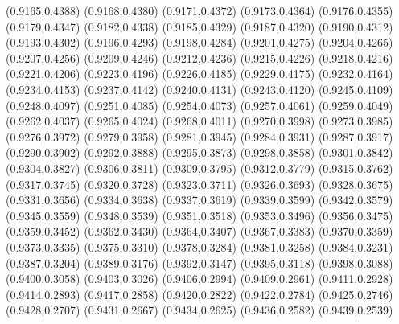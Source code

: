 \PST@Cross(0.9165,0.4388)
\PST@Cross(0.9168,0.4380)
\PST@Cross(0.9171,0.4372)
\PST@Cross(0.9173,0.4364)
\PST@Cross(0.9176,0.4355)
\PST@Cross(0.9179,0.4347)
\PST@Cross(0.9182,0.4338)
\PST@Cross(0.9185,0.4329)
\PST@Cross(0.9187,0.4320)
\PST@Cross(0.9190,0.4312)
\PST@Cross(0.9193,0.4302)
\PST@Cross(0.9196,0.4293)
\PST@Cross(0.9198,0.4284)
\PST@Cross(0.9201,0.4275)
\PST@Cross(0.9204,0.4265)
\PST@Cross(0.9207,0.4256)
\PST@Cross(0.9209,0.4246)
\PST@Cross(0.9212,0.4236)
\PST@Cross(0.9215,0.4226)
\PST@Cross(0.9218,0.4216)
\PST@Cross(0.9221,0.4206)
\PST@Cross(0.9223,0.4196)
\PST@Cross(0.9226,0.4185)
\PST@Cross(0.9229,0.4175)
\PST@Cross(0.9232,0.4164)
\PST@Cross(0.9234,0.4153)
\PST@Cross(0.9237,0.4142)
\PST@Cross(0.9240,0.4131)
\PST@Cross(0.9243,0.4120)
\PST@Cross(0.9245,0.4109)
\PST@Cross(0.9248,0.4097)
\PST@Cross(0.9251,0.4085)
\PST@Cross(0.9254,0.4073)
\PST@Cross(0.9257,0.4061)
\PST@Cross(0.9259,0.4049)
\PST@Cross(0.9262,0.4037)
\PST@Cross(0.9265,0.4024)
\PST@Cross(0.9268,0.4011)
\PST@Cross(0.9270,0.3998)
\PST@Cross(0.9273,0.3985)
\PST@Cross(0.9276,0.3972)
\PST@Cross(0.9279,0.3958)
\PST@Cross(0.9281,0.3945)
\PST@Cross(0.9284,0.3931)
\PST@Cross(0.9287,0.3917)
\PST@Cross(0.9290,0.3902)
\PST@Cross(0.9292,0.3888)
\PST@Cross(0.9295,0.3873)
\PST@Cross(0.9298,0.3858)
\PST@Cross(0.9301,0.3842)
\PST@Cross(0.9304,0.3827)
\PST@Cross(0.9306,0.3811)
\PST@Cross(0.9309,0.3795)
\PST@Cross(0.9312,0.3779)
\PST@Cross(0.9315,0.3762)
\PST@Cross(0.9317,0.3745)
\PST@Cross(0.9320,0.3728)
\PST@Cross(0.9323,0.3711)
\PST@Cross(0.9326,0.3693)
\PST@Cross(0.9328,0.3675)
\PST@Cross(0.9331,0.3656)
\PST@Cross(0.9334,0.3638)
\PST@Cross(0.9337,0.3619)
\PST@Cross(0.9339,0.3599)
\PST@Cross(0.9342,0.3579)
\PST@Cross(0.9345,0.3559)
\PST@Cross(0.9348,0.3539)
\PST@Cross(0.9351,0.3518)
\PST@Cross(0.9353,0.3496)
\PST@Cross(0.9356,0.3475)
\PST@Cross(0.9359,0.3452)
\PST@Cross(0.9362,0.3430)
\PST@Cross(0.9364,0.3407)
\PST@Cross(0.9367,0.3383)
\PST@Cross(0.9370,0.3359)
\PST@Cross(0.9373,0.3335)
\PST@Cross(0.9375,0.3310)
\PST@Cross(0.9378,0.3284)
\PST@Cross(0.9381,0.3258)
\PST@Cross(0.9384,0.3231)
\PST@Cross(0.9387,0.3204)
\PST@Cross(0.9389,0.3176)
\PST@Cross(0.9392,0.3147)
\PST@Cross(0.9395,0.3118)
\PST@Cross(0.9398,0.3088)
\PST@Cross(0.9400,0.3058)
\PST@Cross(0.9403,0.3026)
\PST@Cross(0.9406,0.2994)
\PST@Cross(0.9409,0.2961)
\PST@Cross(0.9411,0.2928)
\PST@Cross(0.9414,0.2893)
\PST@Cross(0.9417,0.2858)
\PST@Cross(0.9420,0.2822)
\PST@Cross(0.9422,0.2784)
\PST@Cross(0.9425,0.2746)
\PST@Cross(0.9428,0.2707)
\PST@Cross(0.9431,0.2667)
\PST@Cross(0.9434,0.2625)
\PST@Cross(0.9436,0.2582)
\PST@Cross(0.9439,0.2539)
